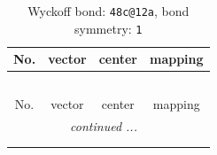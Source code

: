 \documentclass[fleqn,8pt]{jsarticle}
\begin{document}
\renewcommand{\arraystretch}{1.2}
\begin{longtable}{cccc}
\caption{Wyckoff bond: {\tt 48c@12a}, bond symmetry: {\tt 1}}
 \\
 \hline \hline
No. & vector & center & mapping \\ \hline \endfirsthead

\multicolumn{3}{l}{\tablename\ \thetable{}} \\
 \hline \hline
No. & vector & center & mapping \\ \hline \endhead

 \hline \hline
\multicolumn{3}{r}{\footnotesize\it continued ...} \\ \endfoot

 \hline \hline
\multicolumn{3}{r}{} \\ \endlastfoot


\end{longtable}
\end{document}
